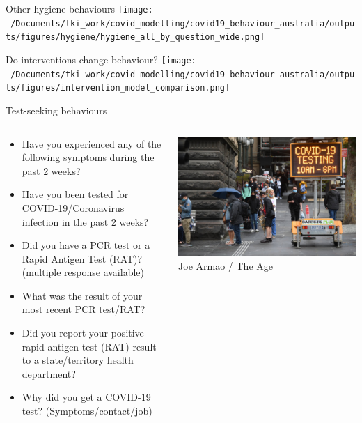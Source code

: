 \documentclass[
  ignorenonframetext,
  aspectratio=149,
]{beamer}
\providecommand{\tightlist}{%
  \setlength{\itemsep}{0pt}\setlength{\parskip}{0pt}}\usepackage{longtable,booktabs,array}
\begin{document}
\begin{frame}{Other hygiene behaviours}
\label{other-hygiene-behaviours-1}
\texttt{[image: ~/Documents/tki\_work/covid\_modelling/covid19\_behaviour\_australia/outputs/figures/hygiene/hygiene\_all\_by\_question\_wide.png]}
\end{frame}

\begin{frame}{Do interventions change behaviour?}
\label{do-interventions-change-behaviour}
\texttt{[image: ~/Documents/tki\_work/covid\_modelling/covid19\_behaviour\_australia/outputs/figures/intervention\_model\_comparison.png]}
\end{frame}

\begin{frame}{Test-seeking behaviours}
\label{test-seeking-behaviours}
\begin{columns}[T]
\begin{column}{0.7\textwidth}
\begin{itemize}
\tightlist
\item
  Have you experienced any of the following symptoms during the past 2
  weeks?
\item
  Have you been tested for COVID-19/Coronavirus infection in the past 2
  weeks?
\item
  Did you have a PCR test or a Rapid Antigen Test (RAT)? (multiple
  response available)
\item
  What was the result of your most recent PCR test/RAT?
\item
  Did you report your positive rapid antigen test (RAT) result to a
  state/territory health department?
\item
  Why did you get a COVID-19 test? (Symptoms/contact/job)
\end{itemize}
\end{column}

\begin{column}{0.3\textwidth}
\includegraphics{images/testing_queue_the_age_JoeArmao.jpeg} Joe Armao /
The Age
\end{column}
\end{columns}
\end{frame}
\end{document}
